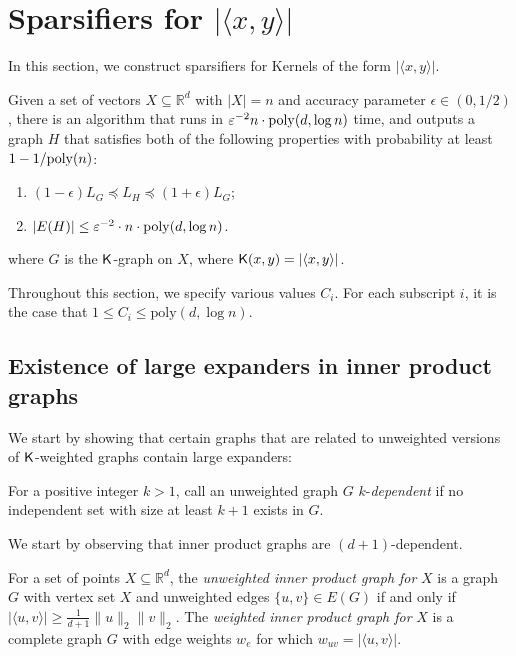 \section{Sparsifiers for \texorpdfstring{$| \langle x,y \rangle|$}{}}

In this section, we construct sparsifiers for Kernels of the form $| \langle x,y \rangle |$.


\begin{lemma}\label{lem:inner-sparsify}
Given a set of vectors $X\subseteq \mathbb{R}^d$ with $|X|=n$ and accuracy parameter $\epsilon \in (0,1/2)$, there is an algorithm that runs in $\varepsilon^{-2} n \cdot \mathrm{poly}(d, \log n)$ time, and outputs a graph $H$ that satisfies both of the following properties with probability at least $1 - 1/\mathrm{poly}(n)$:
\begin{enumerate}
    \item $(1 - \epsilon)L_G\preceq L_H\preceq (1 + \epsilon)L_G$;
    \item $|E(H)|\le  \varepsilon^{-2} \cdot n \cdot \mathrm{poly}(d,\log n)$.
\end{enumerate}
where $G$ is the $\mathsf{K}$-graph on $X$, where $\mathsf{K}(x,y) = |\langle x,y\rangle|$.
\end{lemma}

Throughout this section, we specify various values $C_i$. For each subscript $i$, it is the case that $1\le C_i\le \text{poly}(d,\log n)$.

\subsection{Existence of large expanders in inner product graphs}\label{sec:inner_product_kernel_sparsifier_algorithm}

We start by showing that certain graphs that are related to unweighted versions of $\mathsf{K}$-weighted graphs contain large expanders:

\begin{definition}
For a positive integer $k > 1$, call an unweighted graph $G$ $k$-\emph{dependent} if no independent set with size at least $k+1$ exists in $G$.
\end{definition}

We start by observing that inner product graphs are $(d+1)$-dependent.

\begin{definition}
For a set of points $X\subseteq \mathbb{R}^d$, the \emph{unweighted inner product graph for } $X$ is a graph $G$ with vertex set $X$ and unweighted edges $\{u,v\}\in E(G)$ if and only if $|\langle u,v\rangle| \ge \frac{1}{d+1} \|u\|_2 \|v\|_2$. The \emph{weighted inner product graph for } $X$ is a complete graph $G$ with edge weights $w_e$ for which $w_{uv} = |\langle u,v\rangle|$.
\end{definition}

